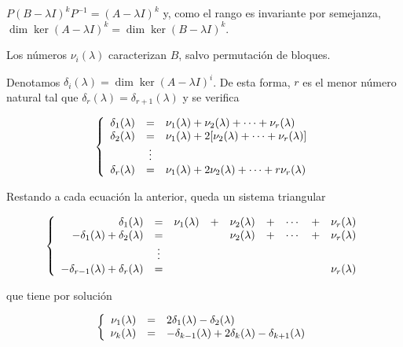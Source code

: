 \documentclass[../ecuaciones_diferenciales.tex]{subfiles}
\begin{document}
\begin{remark}
	\(P(B - \lambda I)^kP^{-1} = (A - \lambda I)^k\) y, como el rango es
	invariante por semejanza, \(\dim \ker (A - \lambda I)^k = \dim \ker (B -
	\lambda I)^k\).
\end{remark}

\begin{remark}
	Los números \(\nu_i(\lambda)\) caracterizan \(B\), salvo permutación de bloques.
\end{remark}

Denotamos \(\delta_i(\lambda) = \dim \ker (A - \lambda I)^i\). De esta forma,
\(r\) es el menor número natural tal que \(\delta_r(\lambda) =
\delta_{r+1}(\lambda)\) y se verifica

\[\left\{
	\begin{array}[ht]{r c l}
		\delta_1(\lambda) & =      & \nu_1(\lambda) + \nu_2(\lambda) + \cdots +
		\nu_r(\lambda)                                                                           \\
		\delta_2(\lambda) & =      & \nu_1(\lambda) + 2[\nu_2(\lambda) + \cdots +
		\nu_r(\lambda)]                                                                          \\
		                  & \vdots &                                                             \\
		\delta_r(\lambda) & =      & \nu_1(\lambda) + 2\nu_2(\lambda) + \cdots + r\nu_r(\lambda)
	\end{array}
	\right.
\]

Restando a cada ecuación la anterior, queda un sistema triangular

\[\left\{
	\begin{array}[ht]{r c c c c c c c c}
		\delta_1(\lambda)                          & =      & \nu_1(\lambda) & + & \nu_2(\lambda) & + & \cdots & + & \nu_r(\lambda) \\
		-\delta_1(\lambda) + \delta_2(\lambda)     & =      &                &   & \nu_2(\lambda) & + & \cdots & + & \nu_r(\lambda) \\
		                                           & \vdots &                                                                       \\
		-\delta_{r-1}(\lambda) + \delta_r(\lambda) & =      &                &   &                &   &        &   & \nu_r(\lambda)
	\end{array}
	\right.
\]

que tiene por solución

\[\left\{
	\begin{array}[ht]{r c l}
		\nu_1(\lambda) & = & 2\delta_1(\lambda) - \delta_2(\lambda)                              \\
		\nu_k(\lambda) & = & -\delta_{k-1}(\lambda) + 2\delta_k(\lambda) - \delta_{k+1}(\lambda)
	\end{array}
	\right.
\]
\end{document}
